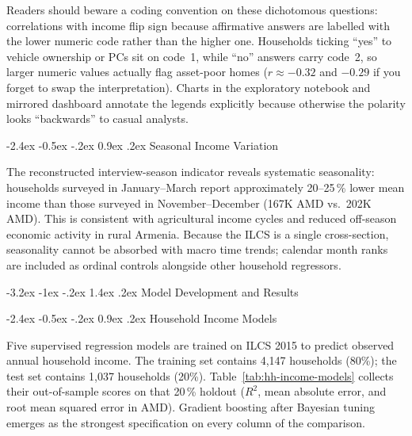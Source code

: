 \documentclass[12pt]{article}
\makeatletter
\renewcommand\section{%
  \@startsection{section}{1}{\z@}%
    {-3.2ex \@plus -1ex \@minus -.2ex}%
    {1.4ex \@plus .2ex}%
    {\color{navyblue}\large\bfseries}}
\renewcommand\subsection{%
  \@startsection{subsection}{2}{\z@}%
    {-2.4ex \@plus -0.5ex \@minus -.2ex}%
    {0.9ex \@plus .2ex}%
    {\color{steelblue}\normalsize\bfseries}}
\let\oldsection\section
\renewcommand{\section}[1]{%
  \oldsection{#1}%
  \noindent{\color{rulecolor}\rule{\linewidth}{0.5pt}}\par\vspace{0.3ex}%
}
\makeatother
\begin{document}
\vspace{0.35em}
\noindent
Readers should beware a coding convention on these dichotomous questions: correlations with income flip sign because affirmative answers are labelled with the lower numeric code rather than the higher one. Households ticking ``yes'' to vehicle ownership or PCs sit on code~1, while ``no'' answers carry code~2, so larger numeric values actually flag asset-poor homes ($r \approx -0.32$ and $-0.29$ if you forget to swap the interpretation). Charts in the exploratory notebook and mirrored dashboard annotate the legends explicitly because otherwise the polarity looks ``backwards'' to casual analysts.

\subsection{Seasonal Income Variation}

\indent\hspace*{1em}
The reconstructed interview-season indicator reveals systematic seasonality:
households surveyed in January--March report approximately 20--25\,\% lower mean
income than those surveyed in November--December (167K AMD vs.\ 202K AMD).
This is consistent with agricultural income cycles and reduced off-season
economic activity in rural Armenia. Because the ILCS is a single cross-section,
seasonality cannot be absorbed with macro time trends; calendar month ranks are
included as ordinal controls alongside other household regressors.

\newpage

\section{Model Development and Results}
\label{sec:model-results}

\subsection{Household Income Models}

\indent\hspace*{1em}
Five supervised regression models are trained on ILCS 2015 to predict observed
annual household income. The training set contains 4,147 households
(80\%); the test set contains 1,037 households (20\%).
Table~\ref{tab:hh-income-models} collects their out-of-sample scores on that 20\,\% holdout ($R^2$, mean absolute error, and root mean squared error in AMD). Gradient boosting after Bayesian tuning emerges as the strongest specification on every column of the comparison.
\end{document}
